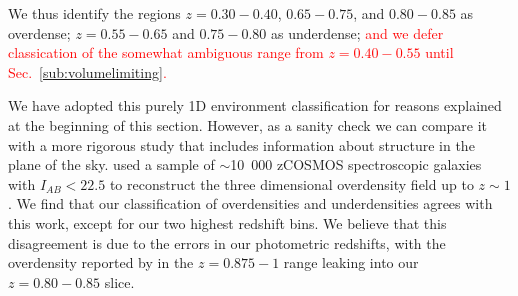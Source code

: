 \documentclass[twocolumn,useAMS,usenatbib]{mn2e}
\newcommand{\rachel}[1]{{\textcolor{red}{#1}}}
\newcommand{\claire}[1]{{\textcolor{magenta}{#1}}}
\begin{document}
We thus identify the regions $z=0.30-0.40$, $0.65-0.75$, and
$0.80-0.85$ as overdense; $z=0.55-0.65$ and $0.75-0.80$ as underdense;
\rachel{and we defer classication of the somewhat ambiguous range from
  $z=0.40-0.55$ until Sec.~\ref{sub:volumelimiting}. }

We have adopted this purely 1D environment classification for reasons
explained at the beginning of this section. However, as a sanity check
we can compare it with a more rigorous study that includes information
about structure in the plane of the sky.  
 \cite{Kovac_Density10k} used a sample of $\sim$10~000 zCOSMOS
 spectroscopic galaxies with $I_{AB}<22.5$ to reconstruct the three dimensional overdensity field up to $z\sim 1$.
We find that our classification of overdensities and underdensities
agrees with this work, except for our two highest redshift bins.
We believe that this disagreement is due to the errors in our
photometric redshifts, with the overdensity reported by
\cite{Kovac_Density10k} in the $z=0.875-1$ range 
leaking into our $z=0.80-0.85$ slice.
\end{document}
